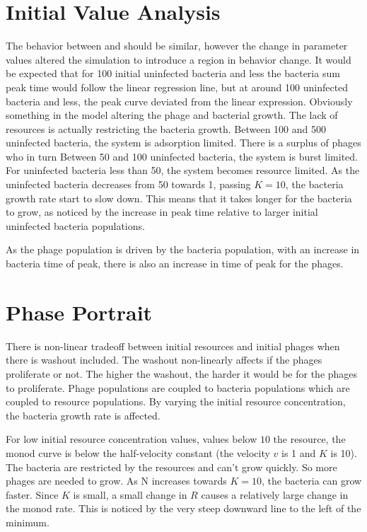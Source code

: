 \section{Initial Value Analysis}
The behavior between  and  should be similar, however the change in parameter values altered the simulation to introduce a region in behavior change. 
It would be expected that for 100 initial uninfected bacteria and less the bacteria sum peak time would follow the linear regression line, but at around 100 uninfected bacteria and less, the peak curve deviated from the linear expression. 
Obviously something in the model altering the phage and bacterial growth. 
The lack of resources is actually restricting the bacteria growth. 
Between 100 and 500 uninfected bacteria, the system is adsorption limited. 
There is a surplus of phages who in turn 
Between 50 and 100 uninfected bacteria, the system is burst limited. 
For uninfected bacteria less than 50, the system becomes resource limited. 
As the uninfected bacteria decreases from 50 towards 1, passing $K=10$, the bacteria growth rate start to slow down. 
This means that it takes longer for the bacteria to grow, as noticed by the increase in peak time relative to larger initial uninfected bacteria populations. 

As the phage population is driven by the bacteria population, with an increase in bacteria time of peak, there is also an increase in time of peak for the phages. 


\section{Phase Portrait}
There is non-linear tradeoff between initial resources and initial phages when there is washout included. 
The washout non-linearly affects if the phages proliferate or not. 
The higher the washout, the harder it would be for the phages to proliferate. 
Phage populations are coupled to bacteria populations which are coupled to resource populations. 
By varying the initial resource concentration, the bacteria growth rate is affected. 

For low initial resource concentration values, values below $10$ the resource, the monod curve is below the half-velocity constant (the velocity $v$ is 1 and $K$ is 10). 
The bacteria are restricted by the resources and can't grow quickly. 
So more phages are needed to grow. 
As N increases towards $K=10$, the bacteria can grow faster. 
Since $K$ is small, a small change in $R$ causes a relatively large change in the monod rate. 
This is noticed by the very steep downward line to the left of the minimum. 

